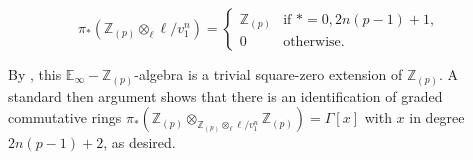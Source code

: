 \documentclass[11pt,leqno]{article}
\newcommand{\zz}{\mathbb{Z}}
\newcommand{\bb}[1]{\mathbb{#1}}
\newtheorem*{short hand}{theorem name}
\theoremstyle{plain}  %
\theoremstyle{definition}
\numberwithin{equation}{section}
\begin{document}
\begin{center}
	\begin{equation*}
	\pi_*(\zz_{(p)}\otimes_{\ell}\ell/v_1^n)=\begin{cases}
		\zz_{(p)} & \text{if } * = 0, 2n(p-1)+1,\\
		0 & \text{otherwise.}
	\end{cases}
	\end{equation*}
\end{center}
By \cite[~Proposition 2.1]{Dundas_2018}, this $\bb{E}_{\infty}-\zz_{(p)}$-algebra is a trivial square-zero extension of $\zz_{(p)}$.  A standard then argument shows that there is an identification of graded commutative rings $\pi_*(\zz_{(p)}\otimes_{\zz_{(p)}\otimes_{\ell}\ell/v_1^n}\zz_{(p)})=\Gamma[x]$ with $x$ in degree $2n(p-1)+2$, as desired.
 
\end{document}
